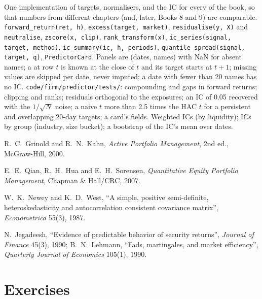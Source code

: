 \begin{build}
 One implementation of targets, normalisers,  and the IC for every  of the book, so that
numbers from different chapters (and, later, Books 8 and 9) are comparable.
 \texttt{forward\_return(ret, h)}, \texttt{excess(target, market)}, \texttt{residualise(y, X)} and
\texttt{neutralise}, \texttt{zscore(x, clip)}, \texttt{rank\_transform(x)}, \texttt{ic\_series(signal, target, method)},
\texttt{ic\_summary(ic, h, periods)}, \texttt{quantile\_spread(signal, target, q)}, \texttt{PredictorCard}.
 Panels are (dates, names) with NaN for absent names; a  at row $t$ is known at the close of $t$ and its target
starts at $t+1$; missing values are skipped per date, never imputed; a date with fewer than 20 names has no IC.
 \texttt{code/firm/predictor/tests/}: compounding and gaps in forward returns; clipping and ranks;
residuals orthogonal to the exposures; an IC of 0.05 recovered with the $1/\sqrt N$ noise; a naive $t$ more than 2.5 times the HAC $t$
for a persistent  and overlapping 20-day targets; a card's fields.
 Weighted ICs (by liquidity); ICs by group (industry, size bucket); a bootstrap of the IC's mean over dates.
\end{build}

\begin{omsources}
\item R.~C.~Grinold and R.~N.~Kahn, \emph{Active Portfolio Management}, 2nd ed., McGraw-Hill, 2000.
\item E.~E.~Qian, R.~H.~Hua and E.~H.~Sorensen, \emph{Quantitative Equity Portfolio Management}, Chapman \& Hall/CRC, 2007.
\item W.~K.~Newey and K.~D.~West, ``A simple, positive semi-definite, heteroskedasticity and autocorrelation consistent covariance
matrix'', \emph{Econometrica} 55(3), 1987.
\item N.~Jegadeesh, ``Evidence of predictable behavior of security returns'', \emph{Journal of Finance} 45(3), 1990; B.~N.~Lehmann,
``Fads, martingales, and market efficiency'', \emph{Quarterly Journal of Economics} 105(1), 1990.
\end{omsources}

\section{Exercises}

